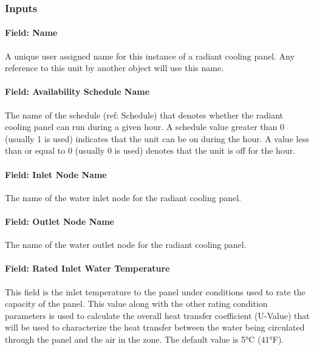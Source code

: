 \subsubsection{Inputs}\label{inputs-3-028-1}

\paragraph{Field: Name}\label{field-name-3-025-1}

A unique user assigned name for this instance of a radiant cooling panel. Any reference to this unit by another object will use this name.

\paragraph{Field: Availability Schedule Name}\label{field-availability-schedule-name-3-005-1}

The name of the schedule (ref: Schedule) that denotes whether the radiant cooling panel can run during a given hour. A schedule value greater than 0 (usually 1 is used) indicates that the unit can be on during the hour. A value less than or equal to 0 (usually 0 is used) denotes that the unit is off for the hour.

\paragraph{Field: Inlet Node Name}\label{field-inlet-node-name-2-002-1}

The name of the water inlet node for the radiant cooling panel.

\paragraph{Field: Outlet Node Name}\label{field-outlet-node-name-2-002-1}

The name of the water outlet node for the radiant cooling panel.

\paragraph{Field: Rated Inlet Water Temperature}\label{field-rated-inlet-water-temperature}

This field is the inlet temperature to the panel under conditions used to rate the capacity of the panel.  This value along with the other rating condition parameters is used to calculate the overall heat transfer coefficient (U-Value) that will be used to characterize the heat transfer between the water being circulated through the panel and the air in the zone.  The default value is 5°C (41°F).

